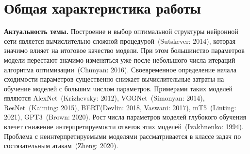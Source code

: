 \documentclass{dissert}
\begin{document}
\clearpage





\section*{Общая характеристика работы}
\textbf{Актуальность темы.}
Построение и выбор оптимальной структуры нейронной сети является вычислительно сложной процедурой~(Sutskever: 2014), которая значимо влияет на итоговое качество модели. 
При этом большинство параметров модели перестают значимо изменяться уже после небольшого числа итераций алгоритма оптимизации~(Chunyan: 2016).
Своевременное определение начала сходимости параметров существенно снижает вычислительные затраты на обучение моделей с большим числом параметров.
Примерами таких моделей являются AlexNet~(Krizhevsky: 2012), VGGNet~(Simonyan: 2014), ResNet~(Kaiming: 2015), BERT(Devlin: 2018, Vaswani: 2017), mT5~(Linting: 2021), GPT3~(Brown: 2020).
Рост числа параметров моделей глубокого обучения влечет снижение интерпретируемости ответов этих моделей~(Ivakhnenko: 1994).
Проблема с неинтерпретируемыми моделями рассматривается в классе задач по состязательным атакам~(Zheng: 2020).
\end{document}
